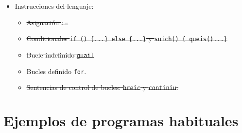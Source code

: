 \documentclass[10pt,a4paper]{article}
\begin{document}
\begin{itemize}
    \item \sout{Instrucciones del lenguaje:}
    \begin{itemize}
        \item \sout{Asignación \texttt{:=}}
        \item \sout{Condicionales \texttt{if () \{...\} else \{...\}} y \texttt{suich() \{ queis()...\}}}
        \item \sout{Bucle indefinido \texttt{guail}}
        \item Bucles definido \texttt{for}.
        \item \sout{Sentencias de control de bucles: \texttt{breic} y \texttt{continiu}.}
    \end{itemize}
\end{itemize}

\newpage
\appendix

\section{Ejemplos de programas habituales}
\end{document}
